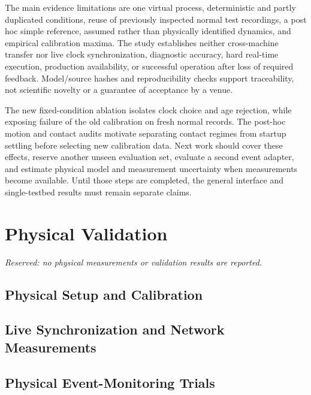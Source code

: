 The main evidence limitations are one virtual process, deterministic and partly duplicated conditions, reuse of previously inspected normal test recordings, a post hoc simple reference, assumed rather than physically identified dynamics, and empirical calibration maxima. The study establishes neither cross-machine transfer nor live clock synchronization, diagnostic accuracy, hard real-time execution, production availability, or successful operation after loss of required feedback. Model/source hashes and reproducibility checks support traceability, not scientific novelty or a guarantee of acceptance by a venue.

The new fixed-condition ablation isolates clock choice and age rejection, while exposing failure of the old calibration on fresh normal records. The post-hoc motion and contact audits motivate separating contact regimes from startup settling before selecting new calibration data. Next work should cover these effects, reserve another unseen evaluation set, evaluate a second event adapter, and estimate physical model and measurement uncertainty when measurements become available. Until those steps are completed, the general interface and single-testbed results must remain separate claims.

\section{Physical Validation}
\label{sec:physical}
\noindent\textit{Reserved: no physical measurements or validation results are reported.}
\subsection{Physical Setup and Calibration}
\vspace{8mm}
\subsection{Live Synchronization and Network Measurements}
\vspace{8mm}
\subsection{Physical Event-Monitoring Trials}
\vspace{8mm}

